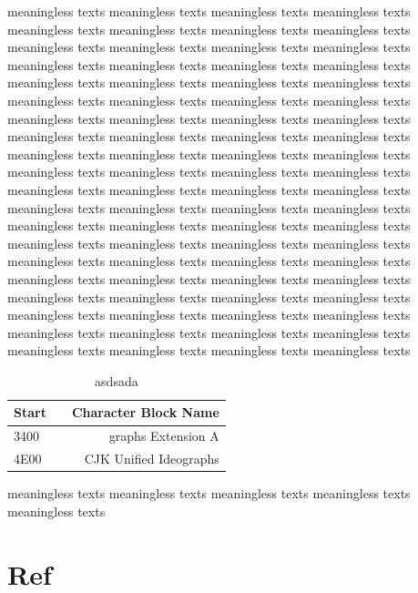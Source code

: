 \documentclass[12pt, twoside, notitlepage, twocolumn]{article}
\begin{document}
        meaningless texts meaningless texts meaningless texts meaningless texts meaningless texts 
        meaningless texts meaningless texts meaningless texts meaningless texts meaningless texts 
        meaningless texts meaningless texts meaningless texts meaningless texts meaningless texts 
        meaningless texts meaningless texts meaningless texts meaningless texts meaningless texts 
        meaningless texts meaningless texts meaningless texts meaningless texts meaningless texts 
        meaningless texts meaningless texts meaningless texts meaningless texts meaningless texts 
        meaningless texts meaningless texts meaningless texts meaningless texts meaningless texts 
        meaningless texts meaningless texts meaningless texts meaningless texts meaningless texts 
        meaningless texts meaningless texts meaningless texts meaningless texts meaningless texts 
        meaningless texts meaningless texts meaningless texts meaningless texts meaningless texts 
        meaningless texts meaningless texts meaningless texts meaningless texts meaningless texts 
        meaningless texts meaningless texts meaningless texts meaningless texts meaningless texts 
        meaningless texts meaningless texts meaningless texts meaningless texts meaningless texts 
        meaningless texts meaningless texts meaningless texts meaningless texts meaningless texts 
        meaningless texts meaningless texts meaningless texts meaningless texts meaningless texts 
        meaningless texts meaningless texts meaningless texts meaningless texts meaningless texts 
        \begin{table}
            \centering
            \begin{tabularx}{9.73cm}{lXr}
            \hline
            Start & & Character Block Name \\
            \hline
            3400  & & graphs Extension A \\
            4E00  & & CJK Unified Ideographs \\
            \hline
            \end{tabularx}
            \caption{asdsada}
        \end{table}
        meaningless texts meaningless texts meaningless texts meaningless texts meaningless texts 
        \section{Ref}
        
        
    
\end{document}
